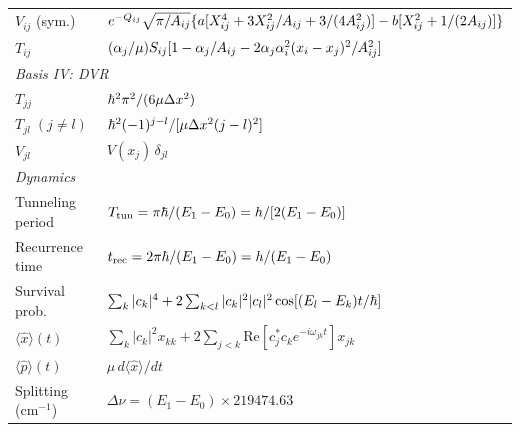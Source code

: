 \begin{center}
\begin{longtable}{p{4.5cm}p{10cm}}
  $V_{ij}$ (sym.)
    & $e^{-Q_{ij}}\sqrt{\pi/A_{ij}}\{a[X_{ij}^4+3X_{ij}^2/A_{ij}+3/(4A_{ij}^2)]-b[X_{ij}^2+1/(2A_{ij})]\}$ \\
  $T_{ij}$
    & $(\alpha_j/\mu)S_{ij}[1-\alpha_j/A_{ij}-2\alpha_j\alpha_i^2(x_i-x_j)^2/A_{ij}^2]$ \\[4pt]
  \midrule
  \multicolumn{2}{l}{\textit{Basis IV: DVR}} \\
  $T_{jj}$
    & $\hbar^2\pi^2/(6\mu\Delta x^2)$ \\
  $T_{jl}\;(j\neq l)$
    & $\hbar^2(-1)^{j-l}/[\mu\Delta x^2(j-l)^2]$ \\
  $V_{jl}$
    & $V(x_j)\,\delta_{jl}$ \\[4pt]
  \midrule
  \multicolumn{2}{l}{\textit{Dynamics}} \\
  Tunneling period
    & $T_{\text{tun}} = \pi\hbar/(E_1-E_0) = h/[2(E_1-E_0)]$ \\
  Recurrence time
    & $t_{\text{rec}} = 2\pi\hbar/(E_1-E_0) = h/(E_1-E_0)$ \\
  Survival prob.
    & $\sum_k|c_k|^4+2\sum_{k<l}|c_k|^2|c_l|^2\cos[(E_l-E_k)t/\hbar]$ \\
  $\langle\hat{x}\rangle(t)$
    & $\sum_k|c_k|^2x_{kk}+2\sum_{j<k}\text{Re}[c_j^*c_ke^{-i\omega_{jk}t}]x_{jk}$ \\
  $\langle\hat{p}\rangle(t)$
    & $\mu\,d\langle\hat{x}\rangle/dt$ \\
  Splitting (cm$^{-1}$)
    & $\Delta\nu = (E_1-E_0)\times 219474.63$ \\[4pt]
  \bottomrule
\end{longtable}
\end{center}

